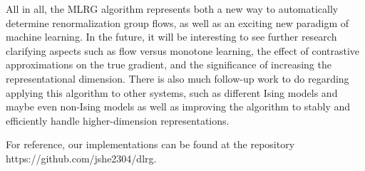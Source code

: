 \documentclass[%
    reprint,
    amsmath,amssymb,
    aps,
]{revtex4-2}
\begin{document}
All in all, the MLRG algorithm represents both a new way to automatically determine renormalization group flows, as well as an exciting new paradigm of machine learning. 
In the future, it will be interesting to see further research clarifying aspects such as flow versus monotone learning, the effect of contrastive approximations on the true gradient, and the significance of increasing the representational dimension.
There is also much follow-up work to do regarding applying this algorithm to other systems, such as different Ising models and maybe even non-Ising models as well as improving the algorithm to stably and efficiently handle higher-dimension representations. 

For reference, our implementations can be found at the repository https://github.com/jshe2304/dlrg. 


\end{document}
